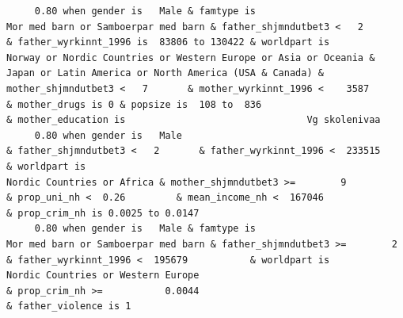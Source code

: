 \documentclass[
  letterpaper,
  DIV=11,
  numbers=noendperiod]{scrreprt}
\begin{document}
\begin{verbatim}
     0.80 when gender is   Male & famtype is                              Mor med barn or Samboerpar med barn & father_shjmndutbet3 <   2       & father_wyrkinnt_1996 is  83806 to 130422 & worldpart is            Norway or Nordic Countries or Western Europe or Asia or Oceania & Japan or Latin America or North America (USA & Canada) & mother_shjmndutbet3 <   7       & mother_wyrkinnt_1996 <    3587           & mother_drugs is 0 & popsize is  108 to  836                                                                                                                                                                        & mother_education is                                Vg skolenivaa                                                                                                                                                                     
     0.80 when gender is   Male                                                                               & father_shjmndutbet3 <   2       & father_wyrkinnt_1996 <  233515           & worldpart is                                                                                                          Nordic Countries or Africa & mother_shjmndutbet3 >=        9                                                                                          & prop_uni_nh <  0.26         & mean_income_nh <  167046                                        & prop_crim_nh is 0.0025 to 0.0147                                                                                                                                                                                                                                                                            
     0.80 when gender is   Male & famtype is                              Mor med barn or Samboerpar med barn & father_shjmndutbet3 >=        2 & father_wyrkinnt_1996 <  195679           & worldpart is                                                                                                  Nordic Countries or Western Europe                                                                                                                                                                                                                            & prop_crim_nh >=           0.0044                                                                                                                                       & father_violence is 1                                                                                                               

\end{verbatim}
\end{document}
